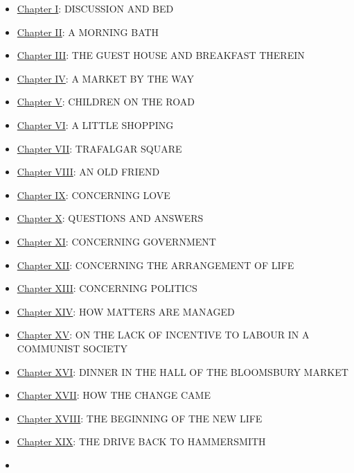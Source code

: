 \begin{itemize}
\tightlist
\item
  \href{/wiki/News_from_Nowhere/Chapter_I}{Chapter I}: DISCUSSION AND
  BED
\item
  \href{/wiki/News_from_Nowhere/Chapter_II}{Chapter II}: A MORNING BATH
\item
  \href{/wiki/News_from_Nowhere/Chapter_III}{Chapter III}: THE GUEST
  HOUSE AND BREAKFAST THEREIN
\item
  \href{/wiki/News_from_Nowhere/Chapter_IV}{Chapter IV}: A MARKET BY THE
  WAY
\item
  \href{/wiki/News_from_Nowhere/Chapter_V}{Chapter V}: CHILDREN ON THE
  ROAD
\item
  \href{/wiki/News_from_Nowhere/Chapter_VI}{Chapter VI}: A LITTLE
  SHOPPING
\item
  \href{/wiki/News_from_Nowhere/Chapter_VII}{Chapter VII}: TRAFALGAR
  SQUARE
\item
  \href{/wiki/News_from_Nowhere/Chapter_VIII}{Chapter VIII}: AN OLD
  FRIEND
\item
  \href{/wiki/News_from_Nowhere/Chapter_IX}{Chapter IX}: CONCERNING LOVE
\item
  \href{/wiki/News_from_Nowhere/Chapter_X}{Chapter X}: QUESTIONS AND
  ANSWERS
\item
  \href{/wiki/News_from_Nowhere/Chapter_XI}{Chapter XI}: CONCERNING
  GOVERNMENT
\item
  \href{/wiki/News_from_Nowhere/Chapter_XII}{Chapter XII}: CONCERNING
  THE ARRANGEMENT OF LIFE
\item
  \href{/wiki/News_from_Nowhere/Chapter_XIII}{Chapter XIII}: CONCERNING
  POLITICS
\item
  \href{/wiki/News_from_Nowhere/Chapter_XIV}{Chapter XIV}: HOW MATTERS
  ARE MANAGED
\item
  \href{/wiki/News_from_Nowhere/Chapter_XV}{Chapter XV}: ON THE LACK OF
  INCENTIVE TO LABOUR IN A COMMUNIST SOCIETY
\item
  \href{/wiki/News_from_Nowhere/Chapter_XVI}{Chapter XVI}: DINNER IN THE
  HALL OF THE BLOOMSBURY MARKET
\item
  \href{/wiki/News_from_Nowhere/Chapter_XVII}{Chapter XVII}: HOW THE
  CHANGE CAME
\item
  \href{/wiki/News_from_Nowhere/Chapter_XVIII}{Chapter XVIII}: THE
  BEGINNING OF THE NEW LIFE
\item
  \href{/wiki/News_from_Nowhere/Chapter_XIX}{Chapter XIX}: THE DRIVE
  BACK TO HAMMERSMITH
\item

\end{itemize}
